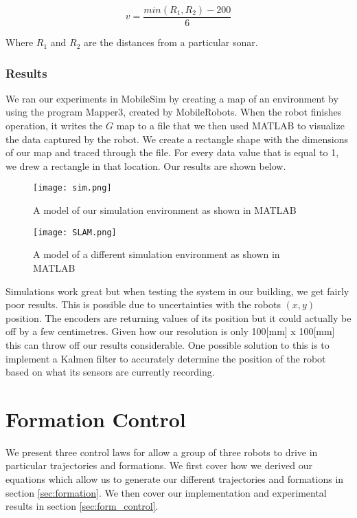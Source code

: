 \documentclass[12pt]{article}
\begin{document}
\[ v = \frac{min(R_1, R_2) - 200}{6} \]

Where $R_1$ and $R_2$ are the distances from a particular sonar. 

\subsubsection{Results}

We ran our experiments in MobileSim by creating a map of an environment by using the program Mapper3, created by MobileRobots. When the robot finishes operation, it writes the $G$ map to a file that we then used MATLAB to visualize the data captured by the robot. We create a rectangle shape with the dimensions of our map and traced through the file. For every data value that is equal to 1, we drew a rectangle in that location. Our results are shown below.


\begin{figure}[htp!]
	\begin{center}
		\texttt{[image: sim.png]}
		\caption{A model of our simulation environment as shown in MATLAB} \label{fig.map}
	\end{center}
\end{figure}

\begin{figure}[htp!]
	\begin{center}
		\texttt{[image: SLAM.png]}
		\caption{A model of a different simulation environment as shown in MATLAB} \label{fig.map2}
	\end{center}
\end{figure}

Simulations work great but when testing the system in our building, we get fairly poor results. This is possible due to uncertainties with the robots $(x,y)$ position. The encoders are returning values of its position but it could actually be off by a few centimetres. Given how our resolution is only 100[mm] x 100[mm] this can throw off our results considerable. One possible solution to this is to implement a Kalmen filter to accurately determine the position of the robot based on what its sensors are currently recording.



\newpage
\section{Formation Control}
We present three control laws for allow a group of three robots to drive in particular trajectories and formations. We first cover how we derived our equations which allow us to generate our different trajectories and formations in section \ref{sec:formation}. We then cover our implementation and experimental results in section \ref{sec:form_control}.
\end{document}
